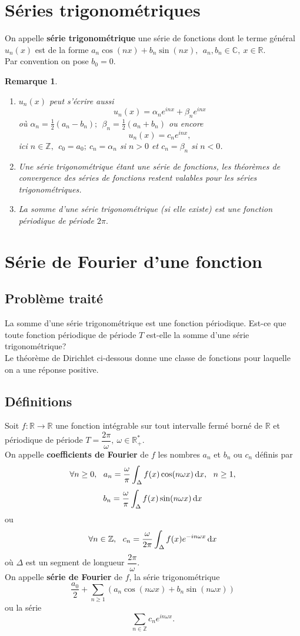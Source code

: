 \documentclass[11pt, a4paper]{book}
\newtheorem{rem}{Remarque}[section]
\begin{document}
\section{S\'eries trigonom\'etriques}
On appelle \textbf{s\'erie trigonom\'etrique} une s\'erie de fonctions dont le terme g\'en\'eral $u_n(x)$ est de la forme $a_n\cos (nx)+b_n\sin (nx),~~a_n,b_n\in \mathbb{C},~x\in \mathbb{R}.$ \\
Par convention on pose $b_0=0.$\\
\begin{rem} \begin{enumerate}
\item $u_n(x)$ peut s'\'ecrire aussi $$u_n(x)=\alpha_n e^{inx}+\beta_n e^{inx}$$ o\`u $\alpha_n=\frac{1}{2}(a_n-b_n);~~\beta_n=\frac{1}{2}(a_n+b_n)$ ou encore $$u_n(x)=c_ne^{inx},$$ ici $n\in \mathbb{Z},~~c_0=a_0;~c_n=\alpha_n$ si $n>0$ et $c_n=\beta_n$ si $n<0$.
\item Une s\'erie trigonom\'etrique \'etant une s\'erie de fonctions, les th\'eor\`emes de convergence des s\'eries de fonctions restent valables pour les s\'eries trigonom\'etriques.
\item La somme d'une s\'erie trigonom\'etrique (si elle existe) est une fonction p\'eriodique de p\'eriode $2\pi.$
\end{enumerate}
\end{rem}
\section{S\'erie de Fourier d'une fonction }
\subsection{Probl\`eme trait\'e}
La somme d'une s\'erie trigonom\'etrique est une fonction p\'eriodique. Est-ce que toute fonction p\'eriodique de p\'eriode $T$ est-elle la somme d'une s\'erie trigonom\'etrique?\\
Le th\'eor\`eme de Dirichlet ci-dessous donne une classe de fonctions pour laquelle on a une r\'eponse positive.
\subsection{D\'efinitions}
Soit $f:\mathbb{R}\rightarrow \mathbb{R}$ une fonction int\'egrable sur tout intervalle ferm\'e born\'e de $\mathbb{R}$ et p\'eriodique de p\'eriode $T=\dfrac{2\pi}{\omega},~\omega\in \mathbb{R}^*_+.$\\ On appelle \textbf{coefficients de Fourier} de $f$ les nombres $a_n$ et $b_n$ ou $c_n$ d\'efinis par $$\forall n\geq 0,~~a_n=\dfrac{\omega}{\pi}\int_\Delta f(x)\cos(n\omega x)\,\mathrm{d} x,~~n\geq1,$$  $$b_n=\dfrac{\omega}{\pi}\int_\Delta f(x)\sin(n\omega x)\,\mathrm{d} x$$ ou $$\forall n\in \mathbb{Z},~~c_n=\dfrac{\omega}{2\pi}\int_\Delta f(x)e^{-in\omega x}\,\mathrm{d} x$$ o\`u $\Delta$ est un segment de longueur $\dfrac{2\pi}{\omega}.$\\
On appelle \textbf{s\'erie de Fourier} de $f$, la s\'erie trigonom\'etrique $$\dfrac{a_0}{2}+\sum_{n\geq 1}\left(a_n\cos (n\omega x)+b_n\sin(n\omega x)\right)$$ ou la s\'erie $$\sum_{n\in \mathbb{Z}}c_ne^{in\omega x}.$$
\end{document}
